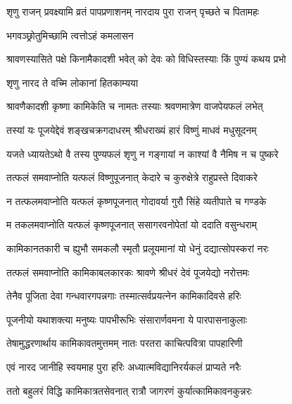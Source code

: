 \twolineshloka
{शृणु राजन् प्रवक्ष्यामि व्रतं पापप्रणाशनम्}
{नारदाय पुरा राजन् पृच्छते च पितामहः} %



\onelineshloka
{भगवञ्छ्रोतुमिच्छामि त्वत्तोऽहं कमलासन} %

\twolineshloka
{श्रावणस्यासिते पक्षे किनामैकादशी भवेत्}
{को देवः को विधिस्तस्याः किं पुण्यं कथय प्रभो} %



\onelineshloka
{शृणु नारद ते वच्मि लोकानां हितकाम्यया} %

\twolineshloka
{श्रावणैकादशी कृष्णा कामिकेति च नामतः}
{तस्याः श्रवणमात्रेण वाजपेयफलं लभेत्} %

\twolineshloka
{तस्यां यः पूजयेद्देवं शङ्खचक्रगदाधरम्}
{श्रीधराख्यं हारं विष्णुं माधवं मधुसूदनम्} %

\twolineshloka
{यजते ध्यायतेऽथो वै तस्य पुण्यफलं शृणु}
{न गङ्गायां न काश्यां वै नैमिष न च पुष्करे} %

\twolineshloka
{तत्फलं समवाप्नोति यत्फलं विष्णुपूजनात्}
{केदारे च कुरुक्षेत्रे राहुप्रस्ते दिवाकरे} %

\twolineshloka
{न तत्फलमवाप्नोति यत्फलं कृष्णपूजनात्}
{गोदावर्या गुरौ सिंहे व्यतीपाते च गण्डके} %

\twolineshloka
{म तकलमवाप्नोति यत्फलं कृष्णपूजनात्}
{ससागरवनोपेतां यो ददाति वसुन्धराम्} %

\twolineshloka
{कामिकानतकारी च ह्युभौ समकलौ स्मृतौ}
{प्रलूयमानां यो धेनुं दद्यात्सोपस्करां नरः} %

\twolineshloka
{तत्फलं समवाप्नोति कामिकाबलकारकः}
{श्रावणे श्रीधरं देवं पूजयेद्यो नरोत्तमः} %

\twolineshloka
{तेनैव पूजिता देवा गन्धवारगपन्नगाः}
{तस्मात्सर्वप्रयत्नेन कामिकादिवसे हरिः} %

\twolineshloka
{पूजनीयो यथाशक्त्या मनुष्यः पापभीरूभिः}
{संसारार्णवमना ये पारपासनाकुलाः} %

\twolineshloka
{तेषामुद्धरणार्थाय कामिकावतमुत्तमम्}
{नातः परतरा काचित्पवित्रा पापहारिणी} %

\twolineshloka
{एवं नारद जानीहि स्वयमाह पुरा हरिः}
{अध्यात्मविद्यानिरर्यकलं प्राप्यते नरैः} %

\twolineshloka
{ततो बहुलरं विद्धि कामिकात्रतसेवनात्}
{रात्रौ जागरणं कुर्यात्कामिकावनकुन्नरः} %

